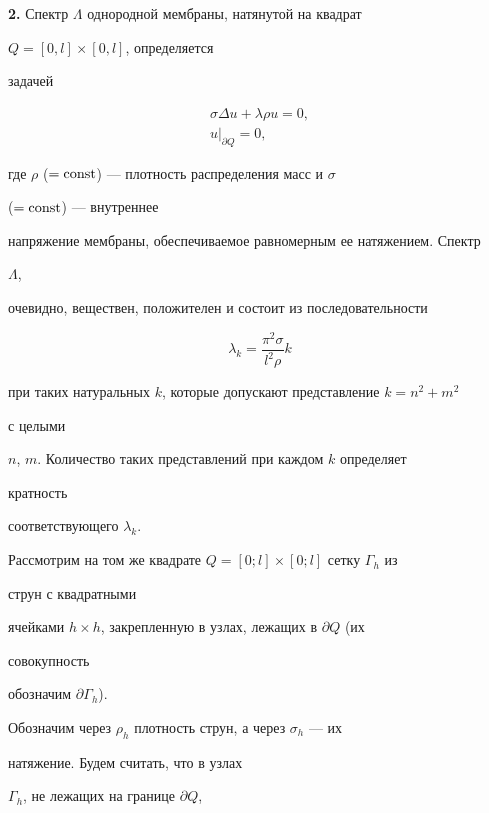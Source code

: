 \medskip 


 


{\bf 2.} Спектр $\Lambda$ однородной мембраны, натянутой на квадрат 


$Q=[0,l]\times[0,l]$, определяется 


задачей 


\begin{gather} 


\sigma\Delta u+\lambda\rho u=0,\\ 


u|_{\partial Q}=0, 


\end{gather} 


где $\rho$ ($=\operatorname{const}$) --- плотность распределения масс и $\sigma$ 


($=\operatorname{const}$) --- внутреннее 


напряжение мембраны, обеспечиваемое равномерным ее натяжением. Спектр 


$\Lambda$, 


очевидно, веществен, положителен и состоит из последовательности 


\begin{equation} 


\lambda_k=\frac{\pi^2\sigma}{l^2\rho}k 


\end{equation} 


при таких натуральных $k$, которые допускают представление $k=n^2+m^2$ 


с целыми 


$n$, $m$. Количество таких представлений при каждом $k$ определяет 


кратность 


соответствующего $\lambda_k$. 


 


Рассмотрим на том же квадрате $Q=[0;l]\times[0;l]$ сетку $\Gamma_h$ из 


струн с квадратными 


ячейками $h\times h$, закрепленную в узлах, лежащих в $\partial Q$ (их 


совокупность 


обозначим $\partial\Gamma_h$). 


Обозначим через $\rho_h$ плотность струн, а через $\sigma_h$ --- их 


натяжение. Будем считать, что в узлах 


$\Gamma_h$, не лежащих на границе $\partial Q$, 


